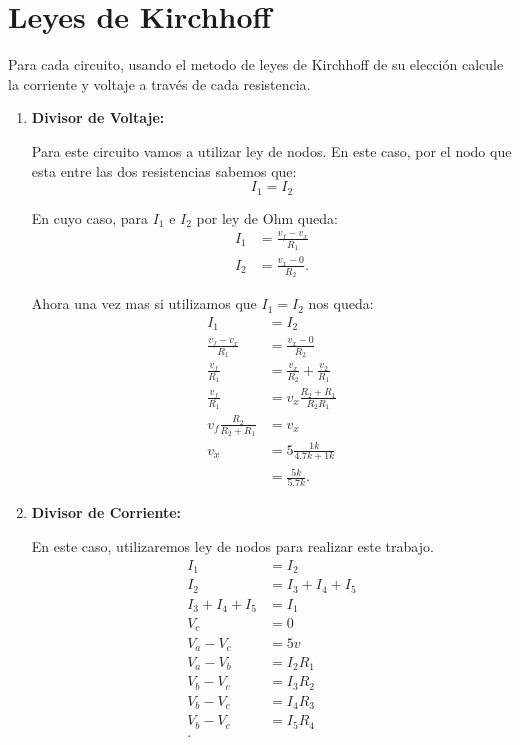\documentclass[a4paper, amsfonts, amssymb, amsmath, reprint, showkeys, nofootinbib, twoside]{revtex4-1}
\begin{document}
\section{Leyes de Kirchhoff}

Para cada circuito, usando el metodo de leyes de Kirchhoff de su elección calcule la corriente y voltaje a través de cada resistencia.

\begin{enumerate}
  \item \textbf{Divisor de Voltaje:} 

    Para este circuito vamos a utilizar ley de nodos. En este caso, por el nodo que esta entre las dos resistencias sabemos que:
    \begin{equation*}
      I_1 = I_2
    \end{equation*}
    
    En cuyo caso, para $I_1$ e $I_2$ por ley de Ohm queda:
    \begin{align*}
      I_1&=\frac{v_{f}-v_{x}}{R_{1}} \\
      I_{2} &= \frac{v_x - 0}{R_2}
    .\end{align*}

    Ahora una vez mas si utilizamos que $I_1=I_2$ nos queda:
    \begin{align*}
      I_1&= I_2 \\
      \frac{v_f - v_x}{R_1}&= \frac{v_x - 0}{R_2} \\
      \frac{v_f}{R_1}&= \frac{v_x}{R_2} + \frac{v_2}{R_1} \\
      \frac{v_f}{R_1} &= v_x \frac{R_2+R_1}{R_2R_1} \\
      v_f \frac{R_2}{R_2+R_1} &= v_x \\
      v_x &= 5 \frac{1k}{4.7k + 1k}\\
      &= \frac{5k}{5.7k}
    .\end{align*}

  \item \textbf{Divisor de Corriente:}

    En este caso, utilizaremos ley de nodos para realizar este trabajo.
    \begin{align*}
      I_1 &= I_2 \\
      I_2 &= I_3 + I_4 + I_5 \\
      I_3 + I_4 + I_5 &= I_1 \\
      V_c &= 0 \\
      V_a - V_c &= 5v \\
      V_a - V_b &= I_2R_1 \\
      V_b - V_c	&= I_3R_{2} \\
      V_b - V_c &= I_4R_3 \\
      V_b - V_c &= I_5R_4 \\
    .\end{align*}


\end{enumerate}
\end{document}
